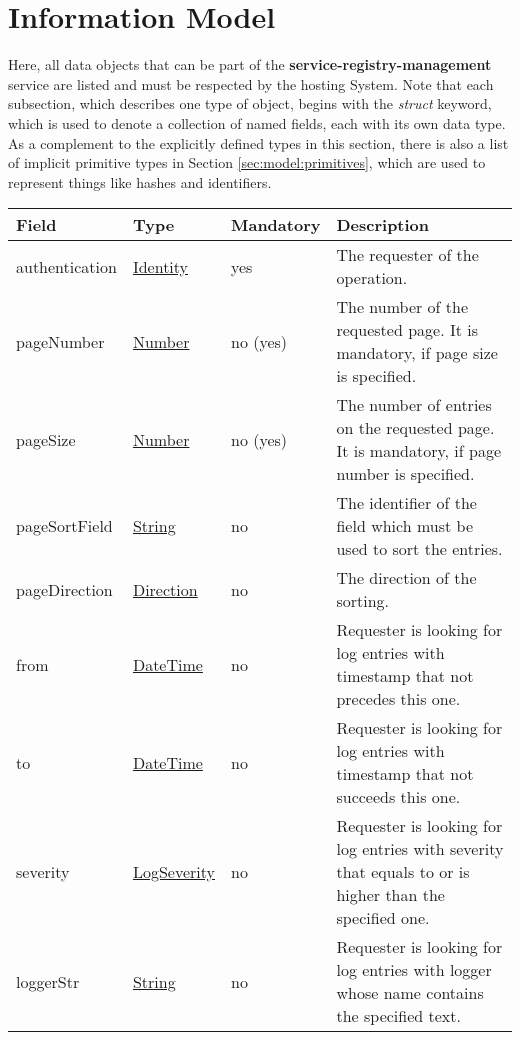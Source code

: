 \documentclass[a4paper]{arrowhead}
\newcommand{\pref}[1]{{\textcolor{ArrowheadGrey}{\hyperref[sec:model:primitives:#1]{#1}}}}
\begin{document}

\clearpage

\section{Information Model}
\label{sec:model}

Here, all data objects that can be part of the \textbf{service-registry-management} service
are listed and must be respected by the hosting System.
Note that each subsection, which describes one type of object, begins with the \textit{struct} keyword, which is used to denote a collection of named fields, each with its own data type.
As a complement to the explicitly defined types in this section, there is also a list of implicit primitive types in Section \ref{sec:model:primitives}, which are used to represent things like hashes and identifiers.

{}
 
\begin{table}[ht!]
\begin{tabularx}{\textwidth}{| p{2.5cm} | p{2.5cm} | p{2cm} | X |} \hline
\rowcolor{gray!33} Field & Type & Mandatory & Description \\ \hline
authentication & \hyperref[sec:model:Identity]{Identity} & yes & The requester of the operation. \\ \hline
pageNumber & \pref{Number} & no (yes) & The number of the requested page. It is mandatory, if page size is specified. \\ \hline
pageSize & \pref{Number} & no (yes) & The number of entries on the requested page. It is mandatory, if page number is specified. \\ \hline
pageSortField & \pref{String} & no & The identifier of the field which must be used to sort the entries. \\ \hline
pageDirection & \pref{Direction} & no & The direction of the sorting. \\ \hline
from & \pref{DateTime} & no & Requester is looking for log entries with timestamp that not precedes this one. \\ \hline
to & \pref{DateTime} & no & Requester is looking for log entries with timestamp that not succeeds this one. \\ \hline
severity & \pref{LogSeverity} & no & Requester is looking for log entries with severity that equals to or is higher than the specified one. \\ \hline
loggerStr &  \pref{String} & no & Requester is looking for log entries with logger whose name contains the specified text. \\ \hline
\end{tabularx}
\end{table}
\end{document}

